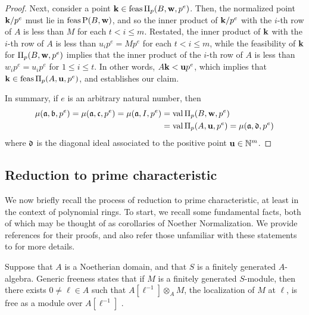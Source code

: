 \documentclass{amsart}
\begin{document}
\begin{proof}
Next, consider a point $\mathbf{k} \in \operatorname{feas} \Pi_p(B, \mathbf{w},p^e)$.  Then, the normalized point $\mathbf{k}/p^e$ must lie in $\operatorname{feas}\mathrm{P}(B,\mathbf{w})$, and so the inner product of $\mathbf{k}/p^e$ with the $i$-th row of $A$ is less than $M$ for each $t < i \leq m$.    Restated, the inner product of $\mathbf{k}$ with the $i$-th row of $A$ is less than $u_ip^e = Mp^e$ for each $t < i \leq m$, while the feasibility of $\mathbf{k}$ for $\Pi_p(B,\mathbf{w},p^e)$ implies that the inner product of the $i$-th row of $A$ is less than $w_ip^e = u_ip^e$ for $1 \leq i \leq t$.  In other words, $A \mathbf{k} < \mathbf{u}p^e$, which implies that $\mathbf{k} \in \operatorname{feas} \Pi_p(A,\mathbf{u},p^e)$, and establishes our claim.

In summary, if $e$ is an arbitrary natural number, then
\begin{align*}
 \mu(\mathfrak{a}, \mathfrak{b}, p^e) = \mu(\mathfrak{a}, \mathfrak{c}, p^e) = \mu(\mathfrak{a}, I, p^e) & = \operatorname{val}\Pi_p(B, \mathbf{w}, p^e) \\
 & = \operatorname{val} \Pi_p(A, \mathbf{u}, p^e) = \mu(\mathfrak{a}, \mathfrak{d}, p^e)
\end{align*}
where $\mathfrak{d}$ is the diagonal ideal associated to the positive point $\mathbf{u} \in \mathbb{N}^m$.
 \end{proof}

\subsection{Reduction to prime characteristic}

We now briefly recall the process of reduction to prime characteristic, at least in the context of polynomial rings.  To start, we recall some fundamental facts, both of which may be thought of as corollaries of Noether Normalization.  We provide references for their proofs, and also refer those unfamiliar with these statements to \cite[Chapter 3]{hernandez.thesis} for more details.

\begin{remark} \label{generic-freeness}
   Suppose that $A$ is a Noetherian domain,  and that $S$ is a finitely generated $A$-algebra.
   Generic freeness states that if $M$ is a finitely generated $S$-module, then there exists  $0 \neq \ell \in A$ such that $A[\ell^{-1}] \otimes_A M$, the localization of $M$ at $\ell$, is free as a module over $A[\ell^{-1}]$  \cite[Theorem~24.1]{matsumura}.
\end{remark}
\end{document}
